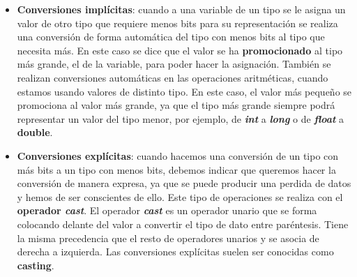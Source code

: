 \begin{itemize}
    \item \textbf{Conversiones implícitas}: cuando a una variable de un tipo se le asigna un valor de otro tipo que requiere menos bits para su representación se realiza una conversión de forma automática del tipo con menos bits al tipo que necesita más. En este caso se dice que el valor se ha \textbf{promocionado} al tipo más grande, el de la variable, para poder hacer la asignación. También se realizan conversiones automáticas en las operaciones aritméticas, cuando estamos usando valores de distinto tipo. En este caso, el valor más pequeño se promociona al valor más grande, ya que el tipo más grande siempre podrá representar un valor del tipo menor, por ejemplo, de \textbf{\textit{int}} a \textbf{\textit{long}} o de \textbf{\textit{float}} a \textbf{double}.

    \item \textbf{Conversiones explícitas}: cuando hacemos una conversión de un tipo con más bits a un tipo con menos bits, debemos indicar que queremos hacer la conversión de manera expresa, ya que se puede producir una perdida de datos y hemos de ser conscientes de ello. Este tipo de operaciones se realiza con el \textbf{operador \textit{cast}}. El operador \textbf{\textit{cast}} es un operador unario que se forma colocando delante del valor a convertir el tipo de dato entre paréntesis. Tiene la misma precedencia que el resto de operadores unarios y se asocia de derecha a izquierda. Las conversiones explícitas suelen ser conocidas como \textbf{casting}.
\end{itemize}






